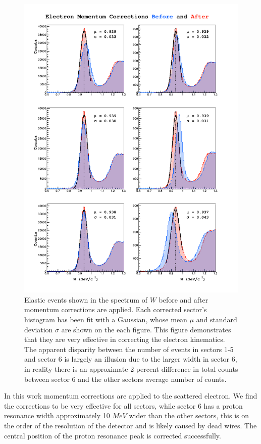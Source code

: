 \begin{figure}
	\centering 
	\includegraphics[width=14cm]{image/plots/basic-analysis/w-mom-corr.png}
	\caption{Elastic events shown in the spectrum of $W$ before and after momentum corrections are applied.  Each corrected sector's histogram has been fit with a Gaussian, whose mean $\mu$ and standard deviation $\sigma$ are shown on the each figure.  This figure demonstrates that they are very effective in correcting the electron kinematics.  The apparent disparity between the number of events in sectors 1-5 and sector 6 is largely an illusion due to the larger width in sector 6, in reality there is an approximate 2 percent difference in total counts between sector 6 and the other sectors average number of counts.}
\end{figure}

In this work momentum corrections are applied to the scattered electron.  We find the corrections to be very effective for all sectors, while sector 6 has a proton resonance width approximately 10 $MeV$ wider than the other sectors, this is on the order of the resolution of the detector and is likely caused by dead wires.  The central position of the proton resonance peak is corrected successfully.
